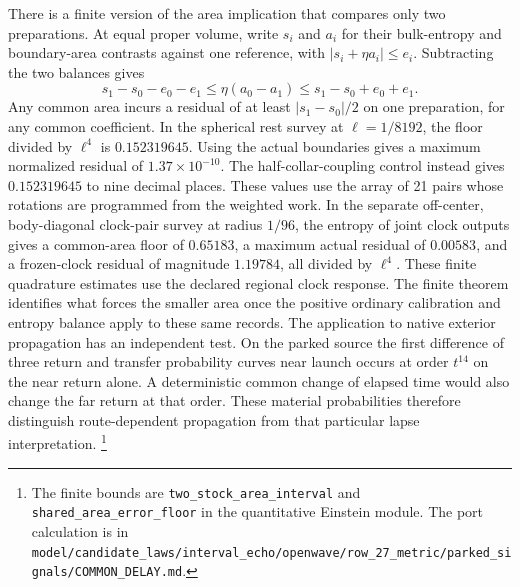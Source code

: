 \documentclass[11pt]{article}
\begin{document}
There is a finite version of the area implication that compares only two
preparations. At equal proper volume, write $s_i$ and $a_i$ for their
bulk-entropy and boundary-area contrasts against one reference, with
$|s_i+\eta a_i|\le e_i$. Subtracting the two balances gives
\[
 s_1-s_0-e_0-e_1 \le \eta(a_0-a_1) \le s_1-s_0+e_0+e_1 .
\]
Any common area incurs a residual of at least $|s_1-s_0|/2$ on one
preparation, for any common coefficient. In the spherical rest survey
at $\ell=1/8192$, the floor divided by $\ell^4$ is $0.152319645$.
Using the actual boundaries gives a maximum normalized residual of
$1.37\times10^{-10}$. The half-collar-coupling control instead gives
$0.152319645$ to nine decimal places. These values use the array of
21 pairs whose rotations are programmed from the weighted work. In the
separate off-center, body-diagonal clock-pair survey at radius $1/96$,
the entropy of joint clock outputs gives a common-area floor of $0.65183$,
a maximum actual residual of $0.00583$, and a frozen-clock residual of
magnitude $1.19784$, all divided by $\ell^4$. These finite quadrature
estimates use the declared regional clock response. The finite theorem identifies
what forces the smaller area once the positive ordinary calibration
and entropy balance apply to these same records. The application to
native exterior propagation has an independent test. On the parked
source the first difference of three return and transfer probability
curves near launch occurs at order $t^{14}$ on the near return alone.
A deterministic common change of elapsed time would also change the
far return at that order. These material probabilities therefore
distinguish route-dependent propagation from that particular lapse
interpretation.%
\footnote{The finite bounds are \texttt{two\_stock\_area\_interval}
and \texttt{shared\_area\_error\_floor} in the quantitative Einstein
module. The port calculation is in
\nolinkurl{model/candidate_laws/interval_echo/openwave/row_27_metric/parked_signals/COMMON_DELAY.md}.}
\end{document}

